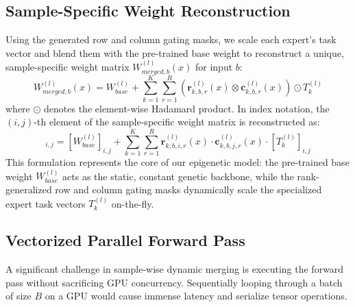\subsection{Sample-Specific Weight Reconstruction}
Using the generated row and column gating masks, we scale each expert's task vector and blend them with the pre-trained base weight to reconstruct a unique, sample-specific weight matrix $W_{merged, b}^{(l)}(x)$ for input $b$:
\begin{equation}
    W_{merged, b}^{(l)}(x) = W_{base}^{(l)} + \sum_{k=1}^K \sum_{r=1}^R \left( \mathbf{r}_{k, b, r}^{(l)}(x) \otimes \mathbf{c}_{k, b, r}^{(l)}(x) \right) \odot T_k^{(l)}
\end{equation}
where $\odot$ denotes the element-wise Hadamard product. In index notation, the $(i,j)$-th element of the sample-specific weight matrix is reconstructed as:
\begin{equation}
    [W_{merged, b}^{(l)}(x)]_{i, j} = [W_{base}^{(l)}]_{i, j} + \sum_{k=1}^K \sum_{r=1}^R \mathbf{r}_{k, b, i, r}^{(l)}(x) \cdot \mathbf{c}_{k, b, j, r}^{(l)}(x) \cdot [T_k^{(l)}]_{i, j}
\end{equation}
This formulation represents the core of our epigenetic model: the pre-trained base weight $W_{base}^{(l)}$ acts as the static, constant genetic backbone, while the rank-generalized row and column gating masks dynamically scale the specialized expert task vectors $T_k^{(l)}$ on-the-fly.

\subsection{Vectorized Parallel Forward Pass}
A significant challenge in sample-wise dynamic merging is executing the forward pass without sacrificing GPU concurrency. Sequentially looping through a batch of size $B$ on a GPU would cause immense latency and serialize tensor operations.

